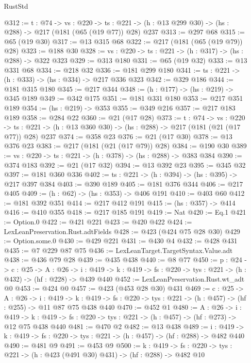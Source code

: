 \begin{lexlean}{RustStd}
\begin{coremodule}
{\begin{coremodule}
{{{{{{{{{{{{{{{{{@312 := {t : @74} ->
  {vs : @220} ->
  {ts : @221} -> (h : @13 @299 @30) -> (hs : @288) -> @217 (@181 (@65 (@19 @77)) @28) @237
@313 := @297 @68
@315 := @65 (@19 @30)
@317 := @13 @315 @68
@322 := @217 (@181 (@65 (@19 @79)) @28)
@323 := @188 @30
@328 := {vs : @220} -> {ts : @221} -> (h : @317) -> (hs : @288) -> @322 @323
@329 := @313 @180
@331 := @65 (@19 @32)
@333 := @13 @331 @68
@334 := @218 @32
@336 := @181 @299 @180
@341 := {ts : @221} -> (h : @333) -> (hs : @334) -> @217 @336 @323
@342 := @329 @186
@344 := @181 @315 @180
@345 := @217 @344
@348 := (h : @177) -> (hs : @219) -> @345 @189
@349 := @342 @175
@351 := @181 @331 @180
@353 := @217 @351 @189
@354 := (hs : @219) -> @353
@355 := @349 @216
@357 := @217 @183 @189
@358 := @284 @22
@360 := @21 (@17 @28)
@373 := {t : @74} ->
  {vs : @220} ->
  {ts : @221} -> (h : @13 @360 @30) -> (hs : @288) -> @217 (@181 (@21 (@17 @77)) @28) @237
@374 := @358 @23
@376 := @21 (@17 @30)
@378 := @13 @376 @23
@383 := @217 (@181 (@21 (@17 @79)) @28)
@384 := @190 @30
@389 := {vs : @220} -> {ts : @221} -> (h : @378) -> (hs : @288) -> @383 @384
@390 := @374 @183
@392 := @21 (@17 @32)
@394 := @13 @392 @23
@395 := @345 @32
@397 := @181 @360 @336
@402 := {ts : @221} -> (h : @394) -> (hs : @395) -> @217 @397 @384
@403 := @390 @189
@405 := @181 @376 @344
@406 := @217 @405
@409 := (h : @62) -> (hs : @353) -> @406 @191
@410 := @403 @60
@412 := @181 @392 @351
@414 := @217 @412 @191
@415 := (hs : @357) -> @414
@416 := @410 @355
@418 := @217 @185 @191
@419 := Nat
@420 := Eq.{1}
@421 := Option.{0}
@422 := @421 @221
@423 := @420 @422
@424 := LexLeanPreservation.Rust.adtFields
@428 := @423 (@424 @75 @28 @30)
@429 := Option.some.{0}
@430 := @429 @221
@431 := @430 @4
@432 := @428 @431
@435 := @7 @229 @87 @75
@436 := LexLeanTarget.TargetSyntax.Value.adt
@438 := @436 @79 @28
@439 := @435 @438
@440 := @8 @77
@450 := {p : @24} ->
  {c : @25} ->
  {A : @26} ->
  {i : @419} -> {k : @419} -> {fs : @220} -> {tys : @221} -> (h : @432) -> (hf : @228) -> @439 @440
@452 := LexLeanPreservation.Rust.wt_adt @0
@453 := @424 @0
@457 := @423 (@453 @28 @30) @431
@469 := {c : @25} ->
  {A : @26} ->
  {i : @419} ->
  {k : @419} -> {fs : @220} -> {tys : @221} -> (h : @457) -> (hf : @255) -> @11 @87 @75 @438 @440
@470 := @452 @1
@480 := {A : @26} ->
  {i : @419} ->
  {k : @419} -> {fs : @220} -> {tys : @221} -> (h : @457) -> (hf : @273) -> @12 @75 @438 @440
@481 := @470 @2
@482 := @13 @438
@489 := {i : @419} ->
  {k : @419} -> {fs : @220} -> {tys : @221} -> (h : @457) -> (hf : @288) -> @482 @440
@490 := @481 @9
@491 := @453 @9
@500 := {k : @419} ->
  {fs : @220} -> {tys : @221} -> (h : @423 (@491 @30) @431) -> (hf : @288) -> @482 @10
}}}}}}}}}}}}}}}}}
\end{coremodule}}
\end{coremodule}
\end{lexlean}
